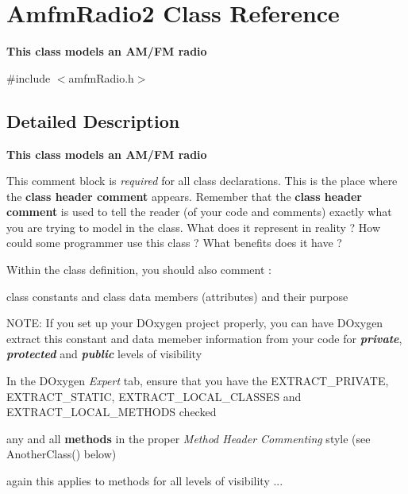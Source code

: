 \hypertarget{class_amfm_radio2}{\section{Amfm\-Radio2 Class Reference}
\label{class_amfm_radio2}
}


{\bfseries This class models an A\-M/\-F\-M radio}  




{\ttfamily \#include $<$amfm\-Radio.\-h$>$}



\subsection{Detailed Description}
{\bfseries This class models an A\-M/\-F\-M radio} 

This comment block is {\itshape required} for all class declarations. This is the place where the {\bfseries class header comment} appears. Remember that the {\bfseries class header comment} is used to tell the reader (of your code and comments) exactly what you are trying to model in the class. What does it represent in reality ? How could some programmer use this class ? What benefits does it have ?

Within the class definition, you should also comment \-:
\begin{DoxyItemize}
\item class constants and class data members (attributes) and their purpose
\begin{DoxyItemize}
\item N\-O\-T\-E\-: If you set up your D\-Oxygen project properly, you can have D\-Oxygen extract this constant and data memeber information from your code for {\bfseries {\itshape private}}, {\bfseries {\itshape protected}} and {\bfseries {\itshape public}} levels of visibility
\item In the D\-Oxygen {\itshape Expert} tab, ensure that you have the E\-X\-T\-R\-A\-C\-T\-\_\-\-P\-R\-I\-V\-A\-T\-E, E\-X\-T\-R\-A\-C\-T\-\_\-\-S\-T\-A\-T\-I\-C, E\-X\-T\-R\-A\-C\-T\-\_\-\-L\-O\-C\-A\-L\-\_\-\-C\-L\-A\-S\-S\-E\-S and E\-X\-T\-R\-A\-C\-T\-\_\-\-L\-O\-C\-A\-L\-\_\-\-M\-E\-T\-H\-O\-D\-S checked
\end{DoxyItemize}
\item any and all {\bfseries methods} in the proper {\itshape Method Header Commenting} style (see Another\-Class() below)
\begin{DoxyItemize}
\item again this applies to methods for all levels of visibility ...
\end{DoxyItemize}
\end{DoxyItemize}

